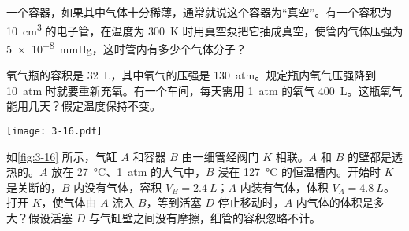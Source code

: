 \begin{Exercise}
\begin{question}
	\item 一个容器，如果其中气体十分稀薄，通常就说这个容器为“真空”。有一个容积为 \qty{10}{cm^3} 的电子管，在温度为 \qty{300}{K} 时用真空泵把它抽成真空，使管内气体压强为 \qty{5e-8}{mmHg}，这时管内有多少个气体分子？
	\item 氧气瓶的容积是 \qty{32}{L}，其中氧气的压强是 \qty{130}{atm}。规定瓶内氧气压强降到 \qty{10}{atm} 时就要重新充氧。有一个车间，每天需用 \qty{1}{atm} 的氧气 \qty{400}{L}。这瓶氧气能用几天？假定温度保持不变。
	\begin{figurehere}
		\begin{minipage}{\linewidth}
			\centering
			\texttt{[image: 3-16.pdf]}
			\caption{}\label{fig:3-16}
		\end{minipage}
	\end{figurehere}
	\item 如\cref{fig:3-16} 所示，气缸 $A$ 和容器 $B$ 由一细管经阀门 $K$ 相联。$A$ 和 $B$ 的壁都是透热的。$A$ 放在 \qty{27}{\celsius}、\qty{1}{atm} 的大气中，$B$ 浸在 \qty{127}{\celsius} 的恒温槽内。开始时 $K$ 是关断的，$B$ 内没有气体，容积 $V_B=\qty{2.4}{L}$；$A$ 内装有气体，体积 $V_A=\qty{4.8}{L}$。打开 $K$，使气体由 $A$ 流入 $B$，等到活塞 $D$ 停止移动时，$A$ 内气体的体积是多大？假设活塞 $D$ 与气缸壁之间没有摩擦，细管的容积忽略不计。
\end{question}
\end{Exercise}

